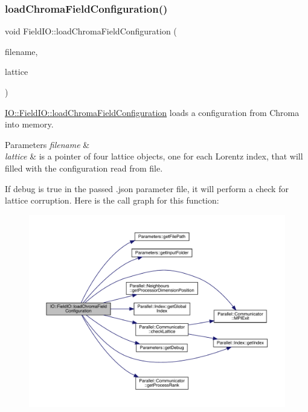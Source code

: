 \subsubsection{\texorpdfstring{loadChromaFieldConfiguration()}{loadChromaFieldConfiguration()}}
{\footnotesize\ttfamily void Field\+I\+O\+::load\+Chroma\+Field\+Configuration (\begin{DoxyParamCaption}\item[{std\+::string}]{filename,  }\item[{\mbox{\hyperlink{class_lattice}{Lattice}}$<$ \mbox{\hyperlink{class_s_u3}{S\+U3}} $>$ $\ast$}]{lattice }\end{DoxyParamCaption})\hspace{0.3cm}{\ttfamily [static]}}



\mbox{\hyperlink{class_i_o_1_1_field_i_o_af23fb6e02a6bd1cafd5be4acacbf848e}{I\+O\+::\+Field\+I\+O\+::load\+Chroma\+Field\+Configuration}} loads a configuration from Chroma into memory. 


\begin{DoxyParams}{Parameters}
{\em filename} & \\
\hline
{\em lattice} & is a pointer of four lattice objects, one for each Lorentz index, that will filled with the configuration read from file.\\
\hline
\end{DoxyParams}
If debug is true in the passed .json parameter file, it will perform a check for lattice corruption. Here is the call graph for this function\+:
\nopagebreak
\begin{figure}[H]
\begin{center}
\leavevmode
\includegraphics[width=350pt]{class_i_o_1_1_field_i_o_af23fb6e02a6bd1cafd5be4acacbf848e_cgraph}
\end{center}
\end{figure}
\mbox{\label{class_i_o_1_1_field_i_o_a02db864a48601edd7febaab5d655e495}} 
